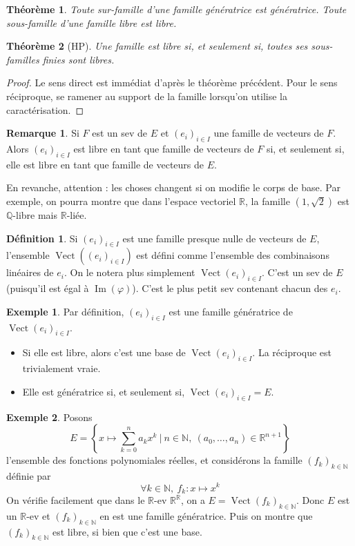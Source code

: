 \documentclass[french]{book}
\newcommand{\N}{\mathbb{N}}
\newcommand{\Q}{\mathbb{Q}}
\newcommand{\R}{\mathbb{R}}
\theoremstyle{plain}
\newtheorem{thm}{Théorème}[chapter]
\theoremstyle{definition}
\newtheorem{dfn}{Définition}[chapter]
\newtheorem{exa}{Exemple}[chapter]
\newtheorem{rmq}{Remarque}[chapter]
\theoremstyle{remark}
\DeclareMathOperator{\vect}{Vect}
\DeclareMathOperator{\im}{Im}
\begin{document}
\begin{thm}
	Toute sur-famille d'une famille génératrice est génératrice. Toute sous-famille d'une famille libre est libre.
\end{thm}
\begin{thm}[HP]
	Une famille est libre si, et seulement si, toutes ses sous-familles finies sont libres.
\end{thm}
\begin{proof}
	Le sens direct est immédiat d'après le théorème précédent. Pour le sens réciproque, se ramener au support de la famille lorsqu'on utilise la caractérisation.
\end{proof}
\begin{rmq}
	Si $F$ est un sev de $E$ et $(e_i)_{i\in I}$ une famille de vecteurs de $F$. Alors $(e_i)_{i\in I}$ est libre en tant que famille de vecteurs de $F$ si, et seulement si, elle est libre en tant que famille de vecteurs de $E$. \par En revanche, attention : les choses changent si on modifie le corps de base. Par exemple, on pourra montre que dans l'espace vectoriel $\R$, la famille $(1,\sqrt{2})$ est $\Q$-libre mais $\R$-liée.
\end{rmq}
\begin{dfn}
	Si $(e_i)_{i\in I}$ est une famille presque nulle de vecteurs de $E$, l'ensemble $\vect((e_i)_{i\in I})$ est défini comme l'ensemble des combinaisons linéaires de $e_i$. On le notera plus simplement $\vect(e_i)_{i\in I}$. C'est un sev de $E$ (puisqu'il est égal à $\im(\varphi)$). C'est le plus petit sev contenant chacun des $e_i$.
\end{dfn}
\begin{exa}
	Par définition, $(e_i)_{i\in I}$ est une famille génératrice de $\vect(e_i)_{i\in I}$. \begin{itemize}
		\item Si elle est libre, alors c'est une base de $\vect(e_i)_{i\in I}$. La réciproque est trivialement vraie.
		\item Elle est génératrice si, et seulement si, $\vect(e_i)_{i\in I}=E$.
	\end{itemize}
\end{exa}
\begin{exa}
	Posons $$E=\left\{x\mapsto\sum_{k=0}^{n}a_kx^k \ | \ n\in\N,\ (a_0,\ldots,a_n)\in\R^{n+1}\right\}$$ l'ensemble des fonctions polynomiales réelles, et considérons la famille $(f_k)_{k\in\N}$ définie par $$ \forall k\in\N,\ f_k:x\mapsto x^k$$ On vérifie facilement que dans le $\R$-ev $\R^\R$, on a $E=\vect(f_k)_{k\in\N}$. Donc $E$ est un $\R$-ev et $(f_k)_{k\in\N}$ en est une famille génératrice. Puis on montre que $(f_k)_{k\in\N}$ est libre, si bien que c'est une base.
\end{exa}
\end{document}
